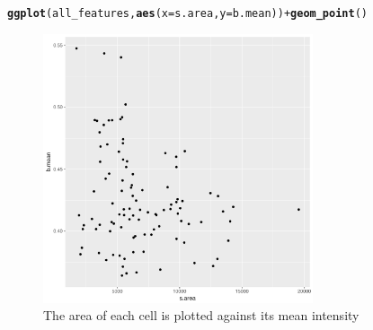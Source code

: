 \documentclass{article}\usepackage[]{graphicx}\usepackage[]{color}
\makeatletter
\newcommand{\hlopt}[1]{\textcolor[rgb]{0,0,0}{#1}}%
\newcommand{\hlstd}[1]{\textcolor[rgb]{0.345,0.345,0.345}{#1}}%
\newcommand{\hlkwc}[1]{\textcolor[rgb]{0.333,0.667,0.333}{#1}}%
\newcommand{\hlkwd}[1]{\textcolor[rgb]{0.737,0.353,0.396}{\textbf{#1}}}%
\newenvironment{kframe}{%
 \def\at@end@of@kframe{}%
 \ifinner\ifhmode%
  \def\at@end@of@kframe{\end{minipage}}%
  \begin{minipage}{\columnwidth}%
 \fi\fi%
 \def\FrameCommand##1{\hskip\@totalleftmargin \hskip-\fboxsep
 \colorbox{shadecolor}{##1}\hskip-\fboxsep
     \hskip-\linewidth \hskip-\@totalleftmargin \hskip\columnwidth}%
 \MakeFramed {\advance\hsize-\width
   \@totalleftmargin\z@ \linewidth\hsize
   \@setminipage}}%
 {\par\unskip\endMakeFramed%
 \at@end@of@kframe}
\newenvironment{knitrout}{}{} %
\makeatother
\begin{document}
\begin{knitrout}
\color{fgcolor}\begin{kframe}
\begin{alltt}
\hlkwd{ggplot}\hlstd{(all_features,} \hlkwd{aes}\hlstd{(}\hlkwc{x}\hlstd{=s.area,} \hlkwc{y}\hlstd{=b.mean))} \hlopt{+} \hlkwd{geom_point}\hlstd{()}
\end{alltt}
\end{kframe}\begin{figure}

{\centering \includegraphics[width=300px]{knit_figure/figscatter-1} 

}

\caption[The area of each cell is plotted against its mean intensity]{The area of each cell is plotted against its mean intensity}\label{fig:scatter}
\end{figure}


\end{knitrout}
\end{document}
